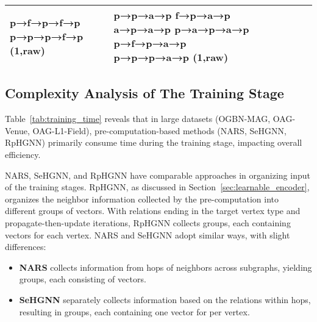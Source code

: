 \documentclass[lettersize,journal]{IEEEtran}
\begin{document}
\begin{table}[!tp]
{\begin{tabular}{|p{18mm}|p{13mm}|p{13mm}|p{13mm}|p{17mm}|p{17mm}|p{17mm}|}
                  p→f→p→f→p \newline
                  p→p→p→f→p \newline 
                  (1,raw)
                  & p→p→a→p \newline
                    f→p→a→p \newline
                    a→p→a→p \newline
                    p→a→p→a→p \newline
                    p→f→p→a→p \newline
                    p→p→p→a→p \newline 
                    (1,raw) \\
      \hline
      \end{tabular}
      }
\end{table}
    

  






\subsection{Complexity Analysis of The Training Stage}


Table~\ref{tab:training_time} reveals that in large datasets (OGBN-MAG, OAG-Venue, OAG-L1-Field), pre-computation-based methods (NARS, SeHGNN, RpHGNN) primarily consume time during the training stage, impacting overall efficiency.


NARS, SeHGNN, and RpHGNN have comparable approaches in organizing input of the training stages. 
RpHGNN, as discussed in Section~\ref{sec:learnable_encoder}, organizes the neighbor information collected by the pre-computation into different groups of vectors. 
With  relations ending in the target vertex type and  propagate-then-update iterations, RpHGNN collects  groups, each containing  vectors for each vertex.
NARS and SeHGNN adopt similar ways, with slight differences:
\begin{itemize}
\item \textbf{NARS} collects information from  hops of neighbors across  subgraphs, yielding  groups, each consisting of  vectors.
\item \textbf{SeHGNN} separately collects information based on the  relations within  hops, resulting in  groups, each containing one vector for per vertex.
\end{itemize}
\end{document}
